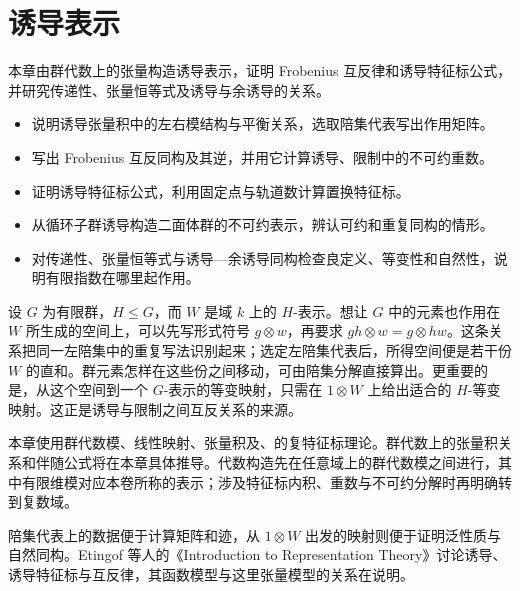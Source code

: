 ﻿%


\chapter{诱导表示}
\label{b5:ch:03}

\begin{chapterabstract}
	本章由群代数上的张量构造诱导表示，证明 Frobenius 互反律和诱导特征标公式，并研究传递性、张量恒等式及诱导与余诱导的关系。
\end{chapterabstract}

\begin{learninggoals}
	\begin{itemize}
		\item 说明诱导张量积中的左右模结构与平衡关系，选取陪集代表写出作用矩阵。
		\item 写出 Frobenius 互反同构及其逆，并用它计算诱导、限制中的不可约重数。
		\item 证明诱导特征标公式，利用固定点与轨道数计算置换特征标。
		\item 从循环子群诱导构造二面体群的不可约表示，辨认可约和重复同构的情形。
		\item 对传递性、张量恒等式与诱导—余诱导同构检查良定义、等变性和自然性，说明有限指数在哪里起作用。
	\end{itemize}
\end{learninggoals}

设 \(G\) 为有限群，\(H\le G\)，而 \(W\) 是域 \(k\) 上的 \(H\)-表示。想让 \(G\) 中的元素也作用在 \(W\) 所生成的空间上，可以先写形式符号 \(g\otimes w\)，再要求 \(gh\otimes w=g\otimes hw\)。这条关系把同一左陪集中的重复写法识别起来；选定左陪集代表后，所得空间便是若干份 \(W\) 的直和。群元素怎样在这些份之间移动，可由陪集分解直接算出。更重要的是，从这个空间到一个 \(G\)-表示的等变映射，只需在 \(1\otimes W\) 上给出适合的 \(H\)-等变映射。这正是诱导与限制之间互反关系的来源。

\ProseParagraphBreak
本章使用群代数模、线性映射、张量积及、的复特征标理论。群代数上的张量积关系和伴随公式将在本章具体推导。代数构造先在任意域上的群代数模之间进行，其中有限维模对应本卷所称的表示；涉及特征标内积、重数与不可约分解时再明确转到复数域。

\ProseParagraphBreak
陪集代表上的数据便于计算矩阵和迹，从 \(1\otimes W\) 出发的映射则便于证明泛性质与自然同构。Etingof 等人的《Introduction to Representation Theory》讨论诱导、诱导特征标与互反律\cite[Sections 5.8--5.10, pp. 105--109]{EtingofEtAl2011RepresentationTheory}，其函数模型与这里张量模型的关系在说明。

